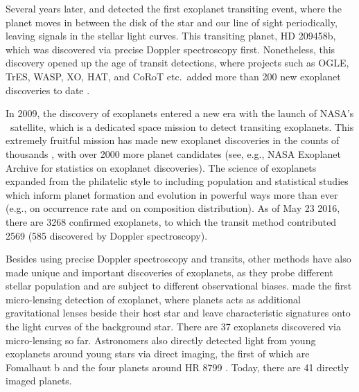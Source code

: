 Several years later, \cite{2000ApJ...529L..41H} and
\cite{2000ApJ...529L..45C} detected the first exoplanet transiting
event, where the planet moves in between the disk of the star and our
line of sight periodically, leaving signals in the stellar light
curves. This transiting planet, HD 209458b, which was discovered via
precise Doppler spectroscopy first. Nonetheless, this discovery opened
up the age of transit detections, where projects such as OGLE, TrES,
WASP, XO, HAT, and CoRoT etc.\ added more than 200 new exoplanet
discoveries to date \citep{2003Natur.421..507K, 2004ApJ...613L.153A,
2006MNRAS.372.1117C, 2006ApJ...648.1228M, 2007ApJ...656..552B}.

In 2009, the discovery of exoplanets entered a new era with the launch
of NASA's \kepler\ satellite, which is a dedicated space mission to
detect transiting exoplanets. This extremely fruitful mission has made
new exoplanet discoveries in the counts of thousands
\citep{2014ApJ...784...45R, 2016ApJ...822...86M}, with over 2000 more
planet candidates (see, e.g., NASA Exoplanet Archive for statistics on
exoplanet discoveries). The science of exoplanets expanded from the
philatelic style to including population and statistical studies which
inform planet formation and evolution in powerful ways more than ever
(e.g., \citealt{2013ApJ...766...81F} on occurrence rate and
\citealt{wolfgang2015b} on composition distribution). As of May
23 2016, there are 3268 confirmed exoplanets, to which the transit
method contributed 2569 (585 discovered by Doppler spectroscopy).

Besides using precise Doppler spectroscopy and transits, other methods
have also made unique and important discoveries of exoplanets, as they
probe different stellar population and are subject to different
observational biases. \cite{2004ApJ...606L.155B} made the first
micro-lensing detection of exoplanet, where planets acts as additional
gravitational lenses beside their host star and leave characteristic
signatures onto the light curves of the background star. There are 37
exoplanets discovered via micro-lensing so far. Astronomers also
directly detected light from young exoplanets around young stars via
direct imaging, the first of which are Fomalhaut b
\citep{2008Sci...322.1345K} and the four planets around HR 8799
\citep{2008Sci...322.1348M}. Today, there are 41 directly imaged
planets.

